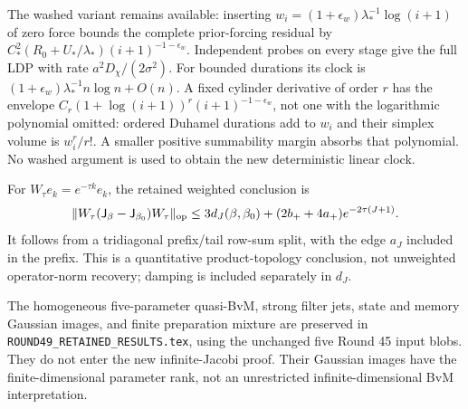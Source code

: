 The washed variant remains available: inserting
$w_i=(1+\epsilon_w)\lambda_*^{-1}\log(i+1)$ of zero force bounds the complete
prior-forcing residual by
$C_*^2(R_0+U_*/\lambda_*)(i+1)^{-1-\epsilon_w}$.
Independent probes on every stage give the full LDP with rate
$a^2D_\chi/(2\sigma^2)$. For bounded durations its clock is
$(1+\epsilon_w)\lambda_*^{-1}n\log n+O(n)$.
A fixed cylinder derivative of order $r$ has the envelope
$C_r(1+\log(i+1))^r(i+1)^{-1-\epsilon_w}$, not one with the logarithmic
polynomial omitted: ordered Duhamel durations add to $w_i$ and their simplex
volume is $w_i^r/r!$. A smaller positive summability margin absorbs that
polynomial. No washed argument is used to obtain the new deterministic linear
clock.

For $W_\tau e_k=e^{-\tau k}e_k$, the retained weighted conclusion is
\[
 \|W_\tau(\mathsf J_\beta-\mathsf J_{\beta_0})W_\tau\|_{\mathrm{op}}
 \le3d_J(\beta,\beta_0)+(2b_++4a_+)e^{-2\tau(J+1)}.
\]
It follows from a tridiagonal prefix/tail row-sum split, with the edge $a_J$
included in the prefix. This is a quantitative product-topology conclusion,
not unweighted operator-norm recovery; damping is included separately in $d_J$.

The homogeneous five-parameter quasi-BvM, strong filter jets, state and memory
Gaussian images, and finite preparation mixture are preserved in
\texttt{ROUND49\_RETAINED\_RESULTS.tex}, using the unchanged five Round 45
input blobs. They do not enter the new infinite-Jacobi proof. Their Gaussian
images have the finite-dimensional parameter rank, not an unrestricted
infinite-dimensional BvM interpretation.
